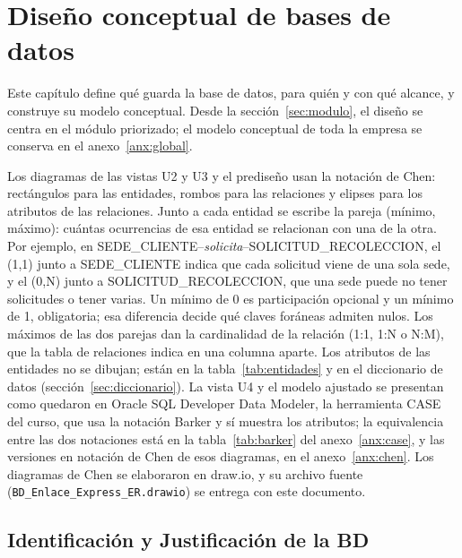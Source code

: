 
\section{Diseño conceptual de bases de datos}

Este capítulo define qué guarda la base de datos, para quién y con qué
alcance, y construye su modelo conceptual. Desde la
sección~\ref{sec:modulo}, el diseño se centra en el módulo priorizado; el
modelo conceptual de toda la empresa se conserva en el
anexo~\ref{anx:global}.

Los diagramas de las vistas U2 y U3 y el prediseño usan la notación de
Chen: rectángulos para las entidades,
rombos para las relaciones y elipses para los atributos de las
relaciones. Junto a cada entidad se escribe la pareja (mínimo, máximo):
cuántas ocurrencias de esa entidad se relacionan con una de la otra. Por
ejemplo, en SEDE\_CLIENTE--\textit{solicita}--SOLICITUD\_RECOLECCION, el
(1,1) junto a SEDE\_CLIENTE indica que cada solicitud viene de una sola
sede, y el (0,N) junto a SOLICITUD\_RECOLECCION, que una sede puede no
tener solicitudes o tener varias. Un mínimo de 0 es participación
opcional y un mínimo de 1, obligatoria; esa diferencia decide qué
claves foráneas admiten nulos. Los máximos de las dos parejas dan la cardinalidad de la
relación (1:1, 1:N o N:M), que la tabla de relaciones indica en una
columna aparte. Los atributos de las entidades no se
dibujan; están en la tabla~\ref{tab:entidades} y en el diccionario de
datos (sección~\ref{sec:diccionario}). La vista U4 y el modelo ajustado
se presentan como quedaron en Oracle SQL Developer Data Modeler, la
herramienta CASE del curso, que usa la notación Barker y sí muestra los
atributos; la equivalencia entre las dos notaciones está en la
tabla~\ref{tab:barker} del anexo~\ref{anx:case}, y las versiones en
notación de Chen de esos diagramas, en el anexo~\ref{anx:chen}. Los
diagramas de Chen se elaboraron en draw.io, y su archivo fuente
(\texttt{BD\_Enlace\_Express\_ER.drawio}) se entrega con este documento.

\subsection{Identificación y Justificación de la BD}

